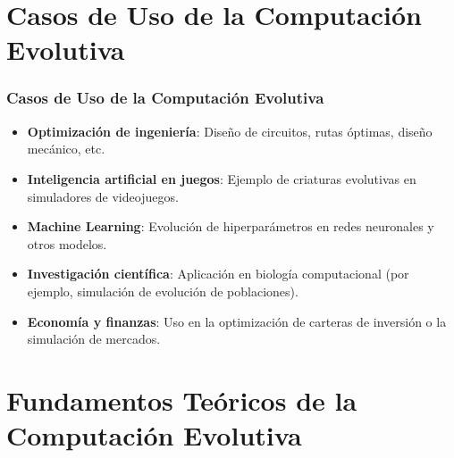 \documentclass[
	11pt, %
]{beamer}
\begin{document}
\section{Casos de Uso de la Computación Evolutiva}
\begin{frame}
    \frametitle{Casos de Uso de la Computación Evolutiva}
    \begin{itemize}
        \item \textbf{Optimización de ingeniería}: Diseño de circuitos, rutas óptimas, diseño mecánico, etc.
        \item \textbf{Inteligencia artificial en juegos}: Ejemplo de criaturas evolutivas en simuladores de videojuegos.
        \item \textbf{Machine Learning}: Evolución de hiperparámetros en redes neuronales y otros modelos.
        \item \textbf{Investigación científica}: Aplicación en biología computacional (por ejemplo, simulación de evolución de poblaciones).
        \item \textbf{Economía y finanzas}: Uso en la optimización de carteras de inversión o la simulación de mercados.
    \end{itemize}
    
\end{frame}

\section{Fundamentos Teóricos de la Computación Evolutiva}
\end{document}
